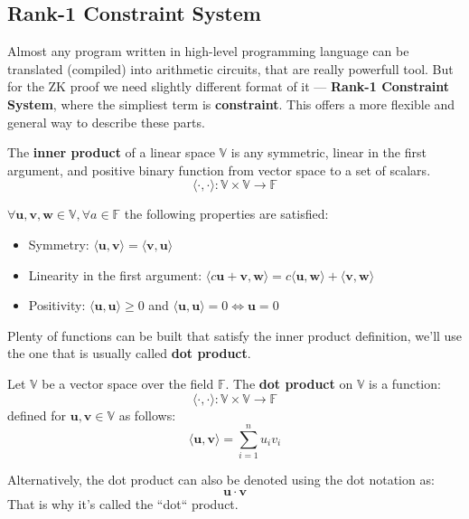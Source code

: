 \documentclass[../lecture-notes.tex]{subfiles}
\begin{document}
\subsection{Rank-1 Constraint System}

Almost any program written in high-level programming language can be translated (compiled) into
arithmetic circuits, that are really powerfull tool. But for the ZK proof we need slightly different
format of it --- \textbf{Rank-1 Constraint System}, where the simpliest term is \textbf{constraint}. 
This offers a more flexible and general way to describe these parts.

\begin{definition}
    The \textbf{inner product} of a linear space $\mathbb{V}$ is any symmetric, linear in the first 
    argument, and positive binary function from vector space to a set of scalars. \\
    \begin{equation*}
        \langle \cdot, \cdot \rangle: \mathbb{V} \times \mathbb{V} \rightarrow \mathbb{F}
    \end{equation*}

    $\forall \mathbf{u}, \mathbf{v}, \mathbf{w} \in \mathbb{V}, \forall a \in \mathbb{F}$ the 
    following properties are satisfied:
    \begin{itemize}
        \item Symmetry: $\langle \mathbf{u}, \mathbf{v} \rangle = \langle \mathbf{v}, \mathbf{u} \rangle$
        \item Linearity in the first argument: $\langle c\mathbf{u} + \mathbf{v}, \mathbf{w} \rangle = c \langle \mathbf{u}, \mathbf{w} \rangle + \langle \mathbf{v}, \mathbf{w} \rangle$
        \item Positivity: $\langle \mathbf{u}, \mathbf{u} \rangle \geq 0$ and $\langle \mathbf{u}, \mathbf{u} \rangle = 0 \Leftrightarrow \mathbf{u} = 0$
    \end{itemize}
\end{definition}

Plenty of functions can be built that satisfy the inner product definition, we'll use the one that
is usually called \textbf{dot product}.
\begin{definition}
    Let $\mathbb{V}$ be a vector space over the field $\mathbb{F}$. The \textbf{dot product} 
    on $\mathbb{V}$ is a function:
    \begin{equation*}
        \langle \cdot, \cdot \rangle: \mathbb{V} \times \mathbb{V} \rightarrow \mathbb{F}
    \end{equation*}
    defined for $\mathbf{u}, \mathbf{v} \in \mathbb{V}$ as follows:
    \begin{equation*}
        \langle \mathbf{u}, \mathbf{v} \rangle = \sum_{i=1}^{n} u_i v_i
    \end{equation*}

    Alternatively, the dot product can also be denoted using the dot notation as:
    \begin{equation*}
        \mathbf{u} \cdot \mathbf{v}
    \end{equation*}
    That is why it's called the ``dot`` product.
\end{definition}
\end{document}
